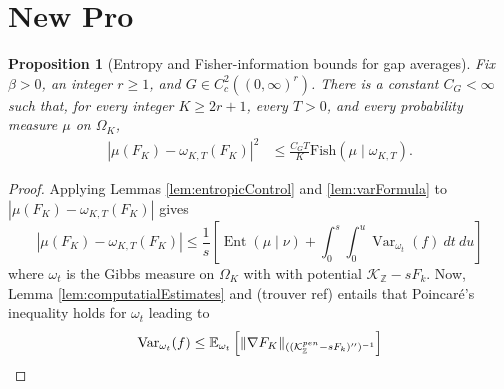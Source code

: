 \documentclass[11pt,reqno]{amsart}
\numberwithin{equation}{section}
\newtheorem{proposition}[theorem]{Proposition}
\theoremstyle{definition}
\theoremstyle{remark}
\newcommand{\Z}{\mathbb Z}
\newcommand{\E}{\mathbb E}
\newcommand{\1}{\mathbf 1}
\newcommand{\Var}{\operatorname{Var}}
\newcommand{\DLR}{\mathcal{K}}
\newcommand{\fish}{\text{Fish}}
\begin{document}
\section{New Pro}
\begin{proposition}[Entropy and Fisher-information bounds for gap averages]\label{prop:gap-entropy}
Fix $\beta>0$, an integer $r\ge1$, and $G\in C_c^2((0,\infty)^r)$.
There is a constant $C_G<\infty$ such that, for every integer
$K\ge2r+1$, every $T>0$, and every probability measure $\mu$ on
$\Omega_K$,
\begin{align}
|\mu(F_K)-\omega_{K,T}(F_K)|^2
&\le \frac{C_GT}{K}\fish(\mu\mid\omega_{K,T}).\label{eq:fisher-gap}
\end{align}
\end{proposition}
\begin{proof}
Applying Lemmas \ref{lem:entropicControl} and \ref{lem:varFormula} to $|\mu(F_K)-\omega_{K,T}(F_K)|$ gives
  $$
|\mu(F_K)-\omega_{K,T}(F_K)|
\le
\frac{1}{s}\left[
\operatorname{Ent}(\mu\mid\nu)
+\int_0^s \int_0^u \Var_{\omega_t}(f)\ dt\ du
\right]
$$
where $\omega_t$ is the Gibbs measure on $\Omega_K$ with with potential $\DLR_\Z-sF_k$. Now, Lemma \ref{lem:computatialEstimates} and (trouver ref) entails that Poincaré's inequality holds for $\omega_t$ leading to
$$
\Var_{\omega_t}(f)\leq \E_{\omega_t}\left[\|\nabla F_K \|_{((\DLR^{\tiny pen}_\Z-sF_k)'')^{-1}}\right]
$$


\end{proof}
\end{document}
